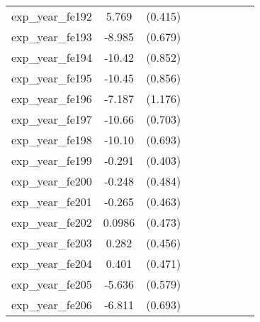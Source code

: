 {\begin{tabular}{l*{4}{cc}}
exp\_year\_fe192&    5.769\sym{***}&  (0.415)&                  &         &                  &         &                  &         \\
exp\_year\_fe193&   -8.985\sym{***}&  (0.679)&                  &         &                  &         &                  &         \\
exp\_year\_fe194&   -10.42\sym{***}&  (0.852)&                  &         &                  &         &                  &         \\
exp\_year\_fe195&   -10.45\sym{***}&  (0.856)&                  &         &                  &         &                  &         \\
exp\_year\_fe196&   -7.187\sym{***}&  (1.176)&                  &         &                  &         &                  &         \\
exp\_year\_fe197&   -10.66\sym{***}&  (0.703)&                  &         &                  &         &                  &         \\
exp\_year\_fe198&   -10.10\sym{***}&  (0.693)&                  &         &                  &         &                  &         \\
exp\_year\_fe199&   -0.291         &  (0.403)&                  &         &                  &         &                  &         \\
exp\_year\_fe200&   -0.248         &  (0.484)&                  &         &                  &         &                  &         \\
exp\_year\_fe201&   -0.265         &  (0.463)&                  &         &                  &         &                  &         \\
exp\_year\_fe202&   0.0986         &  (0.473)&                  &         &                  &         &                  &         \\
exp\_year\_fe203&    0.282         &  (0.456)&                  &         &                  &         &                  &         \\
exp\_year\_fe204&    0.401         &  (0.471)&                  &         &                  &         &                  &         \\
exp\_year\_fe205&   -5.636\sym{***}&  (0.579)&                  &         &                  &         &                  &         \\
exp\_year\_fe206&   -6.811\sym{***}&  (0.693)&                  &         &                  &         &                  &         \\

\end{tabular}}
